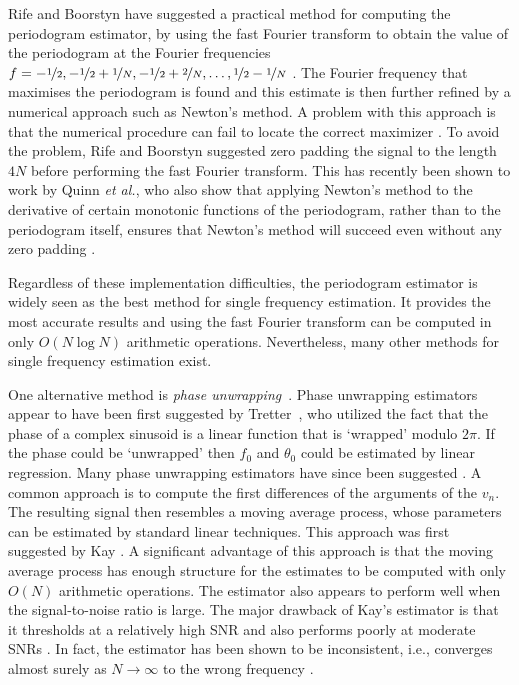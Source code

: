 Rife and Boorstyn have suggested a practical method for computing the
periodogram estimator, by using the fast Fourier transform to obtain the value
of the periodogram at the Fourier frequencies $f =
-\nicefrac{1}{2},-\nicefrac{1}{2}+\nicefrac{1}{N},-\nicefrac{1}{2}+\nicefrac{2}{N},
\dots, \nicefrac{1}{2}-\nicefrac{1}{N}$ \cite{Rife1974}.  The Fourier
frequency that maximises the periodogram is found and this estimate is then
further refined by a numerical approach such as Newton's method.  A problem
with this approach is that the numerical procedure can fail to locate the
correct maximizer \cite{Rice1988}.  To avoid the problem, Rife and Boorstyn
suggested zero padding the signal to the length $4N$ before performing the
fast Fourier transform. This has recently been shown to work by Quinn \emph{et
  al.}, who also show that applying Newton's method to the derivative of
certain monotonic functions of the periodogram, rather than to the periodogram
itself, ensures that Newton's method will succeed even without any zero
padding \cite{Quinn2008maximizing_the_periodogram}.

Regardless of these implementation difficulties, the periodogram estimator is
widely seen as the best method for single frequency estimation.  It provides
the most accurate results and using the fast Fourier transform can be computed
in only $O(N\log{N})$ arithmetic operations.  Nevertheless, many other methods
for single frequency estimation exist.

One alternative method is \emph{phase unwrapping}~\cite{Fowler2002_freq_est_by_phases}.  Phase unwrapping
estimators appear to have been first suggested by Tretter~\cite{Tretter1985},
who utilized the fact that the phase of a complex sinusoid is a linear
function that is `wrapped' modulo $2\pi$.  %
If the phase could be `unwrapped' then $f_0$ and $\theta_0$ could be estimated
by linear regression.  Many phase unwrapping estimators have since been
suggested \cite{Kay1989, Clarkson1994AnalysisKaysVariance, Clarkson1999,
  Lovell1991, Lovell1992_stat_perform_inst_freq_est}. A common approach is to compute the first differences of the
arguments of the $v_n$.  The resulting signal then resembles a moving average
process, whose parameters can be estimated by standard linear techniques.
This approach was first suggested by Kay \cite{Kay1989,
  Clarkson1994AnalysisKaysVariance}.  A significant advantage of this approach
is that the moving average process has enough structure for the estimates to
be computed with only $O(N)$ arithmetic operations.  The estimator also
appears to perform well when the signal-to-noise ratio is large.  The major
drawback of Kay's estimator is that it thresholds at a relatively high SNR and
also performs poorly at moderate SNRs \cite{Clarkson1994}. In fact, the
estimator has been shown to be inconsistent, i.e., converges almost surely as
$N \rightarrow \infty$ to the wrong frequency \cite{Quinn2001}.


